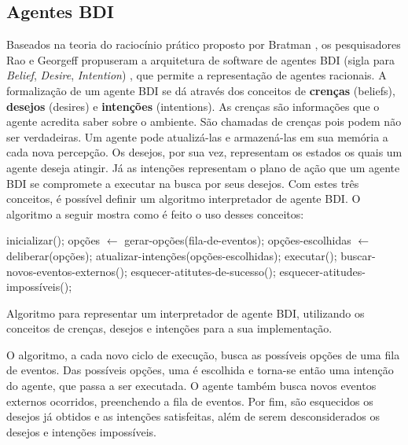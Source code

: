 \subsection{Agentes BDI}
Baseados na teoria do raciocínio prático proposto por Bratman \cite{Bratman199903},
os pesquisadores Rao e Georgeff propuseram a arquitetura de software de agentes
BDI (sigla para \textit{Belief}, \textit{Desire}, \textit{Intention})
\cite{bdi-icmas95}, que permite a representação de agentes racionais. A
formalização de um agente BDI se dá através dos conceitos de \textbf{crenças}
(beliefs), \textbf{desejos} (desires) e \textbf{intenções} (intentions). As
crenças são informações que o agente acredita saber sobre o ambiente.  São
chamadas de crenças pois podem não ser verdadeiras. Um agente pode atualizá-las
e armazená-las em sua memória a cada nova percepção. Os desejos, por sua vez,
representam os estados os quais um agente deseja atingir. Já as intenções
representam o plano de ação que um agente BDI se compromete a executar na busca
por seus desejos. Com estes três conceitos, é possível definir um algoritmo
interpretador de agente BDI. O algoritmo a seguir mostra como é feito o uso
desses conceitos:

\begin{algorithm}[htb]
\begin{center}
	\begin{algorithmic}[1]
        \STATE inicializar();
        \STATE {}
            \STATE opções $\gets$ gerar-opções(fila-de-eventos);
            \STATE opções-escolhidas $\gets$ deliberar(opções);
            \STATE atualizar-intenções(opções-escolhidas);
            \STATE executar();
            \STATE buscar-novos-eventos-externos();
            \STATE esquecer-atitutes-de-sucesso();
            \STATE esquecer-atitudes-impossíveis();
        \ENDWHILE
    \end{algorithmic}
\end{center}
\caption[Algoritmo para representar um interpretador de agente BDI.]
{\label{alg:BDIINTERPRETERALG} Algoritmo para representar um interpretador de
agente BDI, utilizando os conceitos de crenças, desejos e intenções para a sua
implementação.}
\end{algorithm}

O algoritmo, a cada novo ciclo de execução, busca as possíveis opções de uma
fila de eventos. Das possíveis opções, uma é escolhida e torna-se então uma
intenção do agente, que passa a ser executada. O agente também busca novos
eventos externos ocorridos, preenchendo a fila de eventos. Por fim, são
esquecidos os desejos já obtidos e as intenções satisfeitas, além de serem
desconsiderados os desejos e intenções impossíveis.

